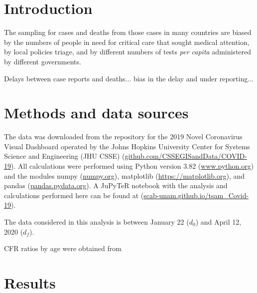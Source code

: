 \documentclass[8pt]{article}
\begin{document}
\section{Introduction}
The sampling for cases and deaths from those cases in many countries are biased by the numbers of people in need for critical care that sought medical attention, by local policies triage, and by different numbers of tests \textit{per capita} administered by different governments. 

Delays between case reports and deaths... bias in the delay and under reporting...

\section{Methods and data sources} 

The data was downloaded from the repository for the 2019 Novel Coronavirus Visual Dashboard operated by the Johns Hopkins University Center for Systems Science and Engineering (JHU CSSE)  (\url{github.com/CSSEGISandData/COVID-19}). 
All calculations were performed using Python version 3.82 (\url{www.python.org}) and the modules numpy (\url{numpy.org}), matplotlib (\url{https://matplotlib.org}), and pandas (\url{pandas.pydata.org}). 
A JuPyTeR notebook with the analysis and calculations performed here can be found at (\url{scab-unam.github.io/tsam_Covid-19}).

The data considered in this analysis is between January 22 ($d_0$) and April 12, 2020 ($d_f$).

CFR ratios by age were obtained from \citep{}


\section{Results}
\end{document}

